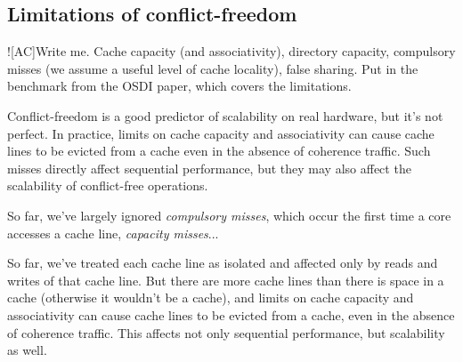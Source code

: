 \subsection{Limitations of conflict-freedom}
\label{sec:scalability:limits}

\XXX![AC]{Write me.  Cache capacity (and associativity), directory
  capacity, compulsory misses (we assume a useful level of cache
  locality), false sharing.  Put in the benchmark from the OSDI paper,
  which covers the limitations.}

Conflict-freedom is a good predictor of scalability on real hardware,
but it's not perfect.  In practice, limits on cache capacity and
associativity can cause cache lines to be evicted from a cache even in
the absence of coherence traffic.  Such misses directly affect
sequential performance, but they may also affect the scalability of
conflict-free operations.




So far, we've largely ignored \emph{compulsory misses}, which occur
the first time a core accesses a cache line, \emph{capacity misses}...




So far, we've treated each cache line as isolated and affected only by
reads and writes of that cache line.  But there are more cache lines
than there is space in a cache (otherwise it wouldn't be a cache), and
limits on cache capacity and associativity can cause cache lines to be
evicted from a cache, even in the absence of coherence traffic.  This
affects not only sequential performance, but scalability as well.
